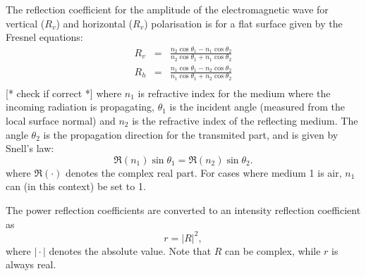  The reflection coefficient for the amplitude of the electromagnetic
 wave for vertical ($R_v$) and horizontal ($R_v$) polarisation is
 for a flat surface given by the Fresnel equations:
 \begin{eqnarray}
   \label{eq:rte_fresnel}
   R_v &=& \frac{n_2\cos\theta_1-n_1\cos\theta_2}
                                           {n_2\cos\theta_1+n_1\cos\theta_2} \\
   R_h &=& \frac{n_1\cos\theta_1-n_2\cos\theta_2}
                                           {n_1\cos\theta_1+n_2\cos\theta_2} \\
 \end{eqnarray}
 [* check if correct *] where $n_1$ is refractive index for
 the medium where the incoming radiation is propagating, $\theta_1$ is
 the incident angle (measured from the local surface normal) and $n_2$
 is the refractive index of the reflecting medium. The angle
 $\theta_2$ is the propagation direction for the transmited part, and
 is given by Snell's law:
 \begin{equation}
   \label{eq:rte:snell}
   \Re(n_1)\sin\theta_1 = \Re(n_2)\sin\theta_2.
 \end{equation}
 where $\Re(\cdot)$ denotes the complex real part.
 For cases where medium 1 is air, $n_1$ can (in this context) be set to 1.

 The power reflection coefficients are converted to an intensity
 reflection coefficient as
 \begin{equation}
   \label{eq:rte:R2r}
   r = |R|^2,
 \end{equation}
 where $|\!\cdot\!|$ denotes the absolute value. Note that $R$ can be
 complex, while $r$ is always real.
 
